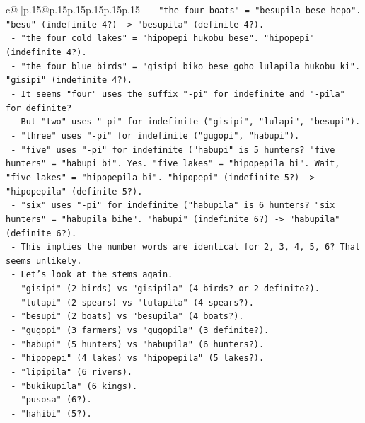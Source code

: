 \documentclass{article}
\begin{document}
{\begin{supertabular}{c@{$\;$}|p{.15\linewidth}@{}p{.15\linewidth}p{.15\linewidth}p{.15\linewidth}p{.15\linewidth}p{.15\linewidth}}
{{{\texttt{       {-} "the four boats" = "besupila bese hepo". "besu" (indefinite 4?) {-}> "besupila" (definite 4?).} \\
\texttt{       {-} "the four cold lakes" = "hipopepi hukobu bese". "hipopepi" (indefinite 4?).} \\
\texttt{       {-} "the four blue birds" = "gisipi biko bese goho lulapila hukobu ki". "gisipi" (indefinite 4?).} \\
\texttt{       {-} It seems "four" uses the suffix "{-}pi" for indefinite and "{-}pila" for definite?} \\
\texttt{       {-} But "two" uses "{-}pi" for indefinite ("gisipi", "lulapi", "besupi").} \\
\texttt{       {-} "three" uses "{-}pi" for indefinite ("gugopi", "habupi").} \\
\texttt{       {-} "five" uses "{-}pi" for indefinite ("habupi" is 5 hunters? "five hunters" = "habupi bi". Yes. "five lakes" = "hipopepila bi". Wait, "five lakes" = "hipopepila bi". "hipopepi" (indefinite 5?) {-}> "hipopepila" (definite 5?).} \\
\texttt{       {-} "six" uses "{-}pi" for indefinite ("habupila" is 6 hunters? "six hunters" = "habupila bihe". "habupi" (indefinite 6?) {-}> "habupila" (definite 6?).} \\
\texttt{       {-} This implies the number words are identical for 2, 3, 4, 5, 6? That seems unlikely.} \\
\texttt{       {-} Let's look at the stems again.} \\
\texttt{       {-} "gisipi" (2 birds) vs "gisipila" (4 birds? or 2 definite?).} \\
\texttt{       {-} "lulapi" (2 spears) vs "lulapila" (4 spears?).} \\
\texttt{       {-} "besupi" (2 boats) vs "besupila" (4 boats?).} \\
\texttt{       {-} "gugopi" (3 farmers) vs "gugopila" (3 definite?).} \\
\texttt{       {-} "habupi" (5 hunters) vs "habupila" (6 hunters?).} \\
\texttt{       {-} "hipopepi" (4 lakes) vs "hipopepila" (5 lakes?).} \\
\texttt{       {-} "lipipila" (6 rivers).} \\
\texttt{       {-} "bukikupila" (6 kings).} \\
\texttt{       {-} "pusosa" (6?).} \\
\texttt{       {-} "hahibi" (5?).} \\
}}}
\end{supertabular}}
\end{document}
